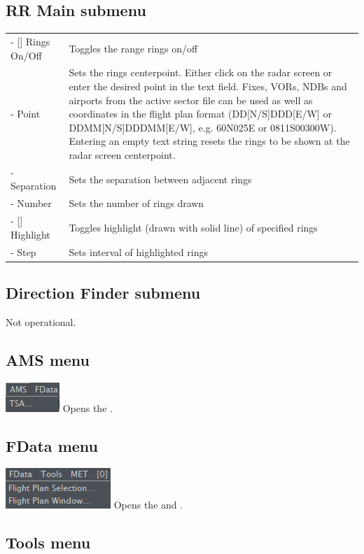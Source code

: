 \documentclass[11pt,a4paper,oldfontcommands]{memoir}
\begin{document}
\subsection*{RR Main submenu}
\begin{tabular}{p{5cm}p{10cm}}
    - [] Rings On/Off & Toggles the range rings on/off
    \\- Point & Sets the rings centerpoint. Either click on the radar screen or
    enter the desired point in the text field. Fixes, VORs, NDBs and
    airports from the active sector file can be used as well as
    coordinates in the flight plan format (DD[N/S]DDD[E/W] or
    DDMM[N/S]DDDMM[E/W], e.g. 60N025E or 0811S00300W).
    Entering an empty text string resets the rings to be shown at
    the radar screen centerpoint.
    \\- Separation & Sets the separation between adjacent rings
    \\- Number & Sets the number of rings drawn
    \\- [] Highlight & Toggles highlight (drawn with solid line) of specified rings
    \\- Step & Sets interval of highlighted rings
\end{tabular}
\medskip

\subsection*{Direction Finder submenu}
Not operational.

\subsection{AMS menu}
\includegraphics{img/AMS.png}
\medskip
Opens the \textit{}.

\subsection{FData menu}
\includegraphics{img/FData.png}
\medskip
Opens the \textit{} and \textit{}.

\subsection{Tools menu}
\end{document}

